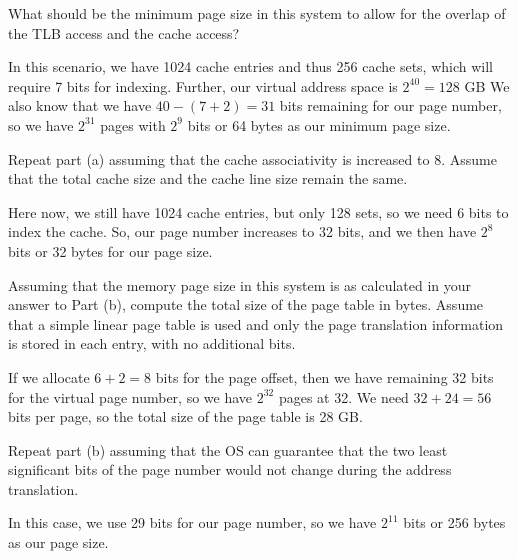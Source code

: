 \documentclass[12pt,letterpaper,twoside]{hmcpset}
\begin{document}
\begin{problem}[2a]
What should be the minimum page size in this system to allow for the overlap of the TLB access and the cache access?
\end{problem}

\begin{solution}
 In this scenario, we have 1024 cache entries and thus 256 cache sets, which will require 7 bits for indexing.  Further, our virtual address space is $2^{40} = 128$ GB  We also know that we have $40 - (7+2)= 31$ bits remaining for our page number, so we have $2^{31}$ pages with $2^9$ bits or 64 bytes as our minimum page size. 
\end{solution}

\begin{problem}[2b]
 Repeat part (a) assuming that the cache associativity is increased to 8. Assume that the total cache size and the cache line size remain the same.
\end{problem}

\begin{solution}
 Here now, we still have 1024 cache entries, but only 128 sets, so we need 6 bits to index the cache.  So, our page number increases to 32 bits, and we then have $2^8$ bits or 32 bytes for our page size.
\end{solution}

\begin{problem}[2c]
 Assuming that the memory page size in this system is as calculated in your answer to Part (b), compute the total size of the page table in bytes.  Assume that a simple linear page table is used and only the page translation information is stored in each entry, with no additional bits.
\end{problem}

\begin{solution}
 If we allocate $6+2=8$ bits for the page offset, then we have remaining 32 bits for the virtual page number, so we have $2^{32}$ pages at 32.  We need $32+24=56$ bits per page, so the total size of the page table is 28 GB.
\end{solution}


\begin{problem}[2d]
 Repeat part (b) assuming that the OS can guarantee that the two least significant bits of the page number would not change during the address translation. 
\end{problem}

\begin{solution}
 In this case, we use 29 bits for our page number, so we have $2^{11}$ bits or 256 bytes as our page size.
\end{solution}
\end{document}
